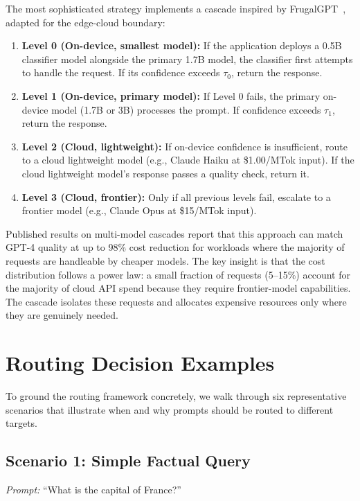 \documentclass[12pt, letterpaper, twoside]{report}
\begin{document}
The most sophisticated strategy implements a cascade inspired by FrugalGPT~\cite{chen2023frugalgpt}, adapted for the edge-cloud boundary:

\begin{enumerate}[itemsep=3pt]
\item \textbf{Level 0 (On-device, smallest model):} If the application deploys a 0.5B classifier model alongside the primary 1.7B model, the classifier first attempts to handle the request. If its confidence exceeds $\tau_0$, return the response.
\item \textbf{Level 1 (On-device, primary model):} If Level 0 fails, the primary on-device model (1.7B or 3B) processes the prompt. If confidence exceeds $\tau_1$, return the response.
\item \textbf{Level 2 (Cloud, lightweight):} If on-device confidence is insufficient, route to a cloud lightweight model (e.g., Claude Haiku at \$1.00/MTok input). If the cloud lightweight model's response passes a quality check, return it.
\item \textbf{Level 3 (Cloud, frontier):} Only if all previous levels fail, escalate to a frontier model (e.g., Claude Opus at \$15/MTok input).
\end{enumerate}

Published results on multi-model cascades report that this approach can match GPT-4 quality at up to 98\% cost reduction for workloads where the majority of requests are handleable by cheaper models. The key insight is that the cost distribution follows a power law: a small fraction of requests (5--15\%) account for the majority of cloud API spend because they require frontier-model capabilities. The cascade isolates these requests and allocates expensive resources only where they are genuinely needed.

\section{Routing Decision Examples}
\label{sec:routing_examples}

To ground the routing framework concretely, we walk through six representative scenarios that illustrate when and why prompts should be routed to different targets.

\subsection{Scenario 1: Simple Factual Query}

\textit{Prompt:} ``What is the capital of France?''
\end{document}
